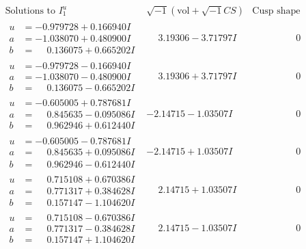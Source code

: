 \documentclass[1p]{elsarticle_modified}
\theoremstyle{definition}
\newcommand{\I}{\sqrt{-1}}
\begin{document}
$$\begin{array}{c|c|c}  
\text{Solutions to }I^u_{1}& \I (\text{vol} + \sqrt{-1}CS) & \text{Cusp shape}\\
 \hline 
\begin{aligned}
u &= -0.979728 + 0.166940 I \\
a &= -1.038070 + 0.480900 I \\
b &= \phantom{-}0.136075 + 0.665202 I\end{aligned}
 & \phantom{-}3.19306 - 3.71797 I & \phantom{-0.000000 } 0 \\ \hline\begin{aligned}
u &= -0.979728 - 0.166940 I \\
a &= -1.038070 - 0.480900 I \\
b &= \phantom{-}0.136075 - 0.665202 I\end{aligned}
 & \phantom{-}3.19306 + 3.71797 I & \phantom{-0.000000 } 0 \\ \hline\begin{aligned}
u &= -0.605005 + 0.787681 I \\
a &= \phantom{-}0.845635 - 0.095086 I \\
b &= \phantom{-}0.962946 + 0.612440 I\end{aligned}
 & -2.14715 - 1.03507 I & \phantom{-0.000000 } 0 \\ \hline\begin{aligned}
u &= -0.605005 - 0.787681 I \\
a &= \phantom{-}0.845635 + 0.095086 I \\
b &= \phantom{-}0.962946 - 0.612440 I\end{aligned}
 & -2.14715 + 1.03507 I & \phantom{-0.000000 } 0 \\ \hline\begin{aligned}
u &= \phantom{-}0.715108 + 0.670386 I \\
a &= \phantom{-}0.771317 + 0.384628 I \\
b &= \phantom{-}0.157147 - 1.104620 I\end{aligned}
 & \phantom{-}2.14715 + 1.03507 I & \phantom{-0.000000 } 0 \\ \hline\begin{aligned}
u &= \phantom{-}0.715108 - 0.670386 I \\
a &= \phantom{-}0.771317 - 0.384628 I \\
b &= \phantom{-}0.157147 + 1.104620 I\end{aligned}
 & \phantom{-}2.14715 - 1.03507 I & \phantom{-0.000000 } 0 \\ \hline\begin{aligned}

\end{aligned}
\end{array}$$
\end{document}
